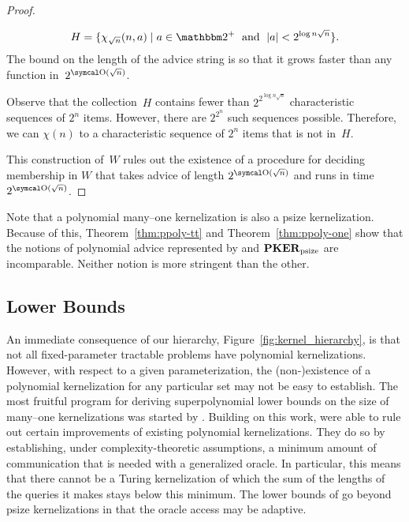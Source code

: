 \begin{proof}
\begin{codelisting}
\begin{codelisting}
      \begin{equation*}
        H = \{\chi_{\sqrt{n}}(n, a) \st a \in \binary^+ \reland \length{a} < 2^{\log n \sqrt{n}}\}.
      \end{equation*}
      The bound on the length of the advice string is so that it grows faster than any function in~$2^{\bigO(\sqrt{n})}$.
    \item
      Observe that the collection~$H$ contains fewer than $2^{2^{\log n \sqrt{n}}}$ characteristic sequences of $2^n$ items.
      However, there are $2^{2^n}$ such sequences possible.
      Therefore, we can  $\chi(n)$ to a characteristic sequence of $2^n$ items that is not in~$H$.
    \end{codelisting}
  \end{codelisting}
  This construction of~$W$ rules out the existence of a procedure for deciding membership in $W$ that takes advice of length $2^{\bigO(\sqrt{n})}$ and runs in time $2^{\bigO(\sqrt{n})}$.
\end{proof}

Note that a polynomial many--one kernelization is also a psize kernelization.
Because of this, Theorem~\ref{thm:ppoly-tt} and Theorem~\ref{thm:ppoly-one} show that the notions of polynomial advice represented by  and $\textnormal{\textbf{PKER}}_\textnormal{psize}$ are incomparable.
Neither notion is more stringent than the other.
%

\subsection{Lower Bounds}
\label{sec:redundancy:lower_bounds}%
An immediate consequence of our hierarchy, Figure~\ref{fig:kernel_hierarchy}, is that not all fixed-parameter tractable problems have polynomial kernelizations.
However, with respect to a given parameterization, the (non-)existence of a polynomial kernelization for any particular set may not be easy to establish.
The most fruitful program for deriving superpolynomial lower bounds on the size of many--one kernelizations was started by \textcite{bodlaender2009problems}.
Building on this work, \textcite{dell2014satisfiability} were able to rule out certain improvements of existing polynomial kernelizations.
They do so by establishing, under complexity-theoretic assumptions, a minimum amount of communication that is needed with a generalized oracle.
In particular, this means that there cannot be a Turing kernelization of which the sum of the lengths of the queries it makes stays below this minimum.
The lower bounds of \citeauthor{dell2014satisfiability} go beyond psize kernelizations in that the oracle access may be adaptive.


